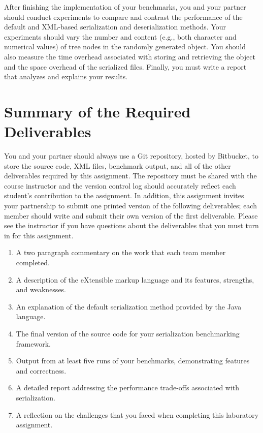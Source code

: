 After finishing the implementation of your benchmarks, you and your partner should conduct experiments to compare and
contrast the performance of the default and XML-based serialization and deserialization methods. Your experiments should
vary the number and content (e.g., both character and numerical values) of tree nodes in the randomly generated object.
You should also measure the time overhead associated with storing and retrieving the object and the space overhead
of the serialized files. Finally, you must write a report that analyzes and explains your results.

\section*{Summary of the Required Deliverables}

You and your partner should always use a Git repository, hosted by Bitbucket, to store the source code, XML files,
benchmark output, and all of the other deliverables required by this assignment. The repository must be shared with the
course instructor and the version control log should accurately reflect each student's contribution to the assignment.
In addition, this assignment invites your partnership to submit one printed version of the following deliverables; each
member should write and submit their own version of the first deliverable. Please see the instructor if you have
questions about the deliverables that you must turn in for this assignment.

\vspace*{-.05in}
\begin{enumerate}
  \setlength{\itemsep}{0pt}
  \item A two paragraph commentary on the work that each team member completed. 
  \item A description of the eXtensible markup language and its features, strengths, and weaknesses.
  \item An explanation of the default serialization method provided by the Java language.
  \item The final version of the source code for your serialization benchmarking framework.
  \item Output from at least five runs of your benchmarks, demonstrating features and correctness.
  \item A detailed report addressing the performance trade-offs associated with serialization.
  \item A reflection on the challenges that you faced when completing this laboratory assignment.
\end{enumerate}
\vspace*{-.05in}

